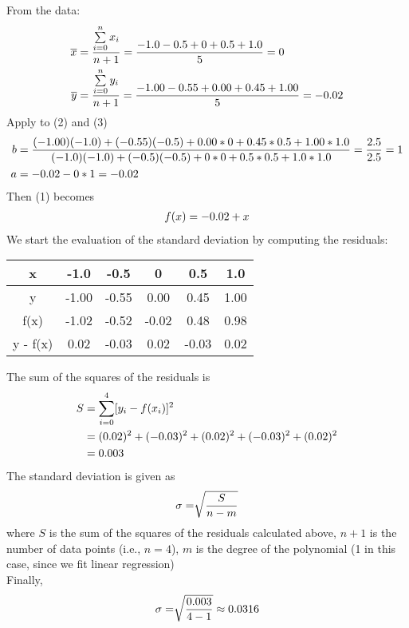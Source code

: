 \begin{exercise}{3}
From the data:
\begin{align}
\notag
\overline{x}&=\frac{\sum\limits_{i=0}^{n} x_i}{n+1} = \frac{-1.0-0.5+0+0.5+1.0}{5} = 0 \\
\notag
\overline{y}&=\frac{\sum\limits_{i=0}^{n} y_i}{n+1}= \frac{-1.00 - 0.55 + 0.00 + 0.45 + 1.00}{5} = -0.02
\end{align}
Apply to (2) and (3)
\begin{align}
\notag
b&= \frac{(-1.00)(-1.0) + (-0.55)(-0.5) + 0.00*0 + 0.45*0.5 + 1.00*1.0}{(-1.0)(-1.0)+(-0.5)(-0.5)+0*0+0.5*0.5+1.0*1.0} = \frac{2.5}{2.5} = 1\\
\notag
a&=-0.02-0*1=-0.02
\end{align}
Then (1) becomes
\begin{align}
\notag
f(x)=-0.02 + x
\end{align}
We start the evaluation of the standard deviation by computing the residuals:
\begin{table}[h]
\centering
\begin{tabular}{|c|c|c|c|c|c|}
\hline
x & -1.0 & -0.5 & 0 & 0.5 & 1.0 \\ \hline
y & -1.00 & -0.55 & 0.00 & 0.45 & 1.00 \\ \hline
f(x) & -1.02 & -0.52 & -0.02 & 0.48 & 0.98 \\ \hline
y - f(x) & 0.02 & -0.03 & 0.02 & -0.03 & 0.02 \\ \hline
\end{tabular}
\end{table}
The sum of the squares of the residuals is
\begin{align}
\notag
S&=\sum\limits_{i=0}^4 [y_i-f(x_i)]^2\\
\notag
 &=(0.02)^2 + (-0.03)^2 + (0.02)^2 + (-0.03)^2 + (0.02)^2\\
 \notag
 &=0.003
\end{align}
The standard deviation is given as
\begin{align}
\notag
\sigma=\sqrt[]{\frac{S}{n-m}}
\end{align}
where $S$ is the sum of the squares of the residuals calculated above, $n + 1$ is the number of data points (i.e., $n = 4$), $m$ is the degree of the polynomial (1 in this case, since we fit linear regression)\\
Finally,
\begin{align}
\notag
\sigma=\sqrt[]{\frac{0.003}{4-1}} \approx 0.0316 
\end{align}
\end{exercise}
